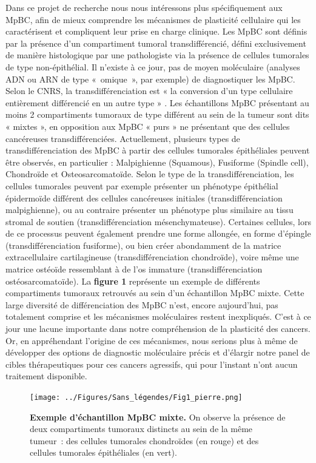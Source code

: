 \documentclass[11pt]{article}
\begin{document}
Dans ce projet de recherche nous nous intéressons plus spécifiquement aux MpBC, afin de mieux comprendre les mécanismes de plasticité cellulaire qui les caractérisent et compliquent leur prise en charge clinique. Les MpBC sont définis par la présence d’un compartiment tumoral transdifférencié, défini exclusivement de manière histologique par une pathologiste via la présence de cellules tumorales de type non-épithélial. Il n’existe à ce jour, pas de moyen moléculaire (analyses ADN ou ARN de type « omique », par exemple) de diagnostiquer les MpBC. Selon le CNRS, la transdifférenciation est « la conversion d’un type cellulaire entièrement différencié en un autre type » \cite{CNRS}. Les échantillons MpBC présentant au moins 2 compartiments tumoraux de type différent au sein de la tumeur sont dits « mixtes », en opposition aux MpBC « purs » ne présentant que des cellules cancéreuses transdifférenciées.
Actuellement, plusieurs types de transdifférenciation des MpBC à partir des cellules tumorales épithéliales peuvent être observés, en particulier : Malpighienne (Squamous), Fusiforme (Spindle cell), Chondroïde et Osteosarcomatoïde. Selon le type de la transdifférenciation, les cellules tumorales peuvent par exemple présenter un phénotype épithélial épidermoïde différent des cellules cancéreuses initiales (transdifférenciation malpighienne), ou au contraire présenter un phénotype plus similaire au tissu stromal de soutien (transdifférenciation mésenchymateuse). Certaines cellules, lors de ce processus peuvent également prendre une forme allongée, en forme d’épingle (transdifférenciation fusiforme), ou bien créer abondamment de la matrice extracellulaire cartilagineuse (transdifférenciation chondroïde), voire même une matrice ostéoïde ressemblant à de l’os immature (transdifférenciation ostéosarcomatoïde). La \textbf{figure 1} représente un exemple de différents compartiments tumoraux retrouvés au sein d’un échantillon MpBC mixte. Cette large diversité de différenciation des MpBC n’est, encore aujourd’hui, pas totalement comprise et les mécanismes moléculaires restent inexpliqués. C’est à ce jour une lacune importante dans notre compréhension de la plasticité des cancers. Or, en appréhendant l’origine de ces mécanismes, nous serions plus à même de développer des options de diagnostic moléculaire précis et d’élargir notre panel de cibles thérapeutiques pour ces cancers agressifs, qui pour l’instant n’ont aucun traitement disponible.



\begin{figure}[htbp]
    \centering
    \texttt{[image: ../Figures/Sans\_légendes/Fig1\_pierre.png]}
    \caption[\textbf{Figure 1 : Exemple d’échantillon MpBC mixte.}]{\footnotesize \textbf{Exemple d’échantillon MpBC mixte.} On observe la présence de deux compartiments tumoraux distincts au sein de la même tumeur : des cellules tumorales chondroïdes (en rouge) et des cellules tumorales épithéliales (en vert).}
    \label{fig:fig1}
\end{figure}
\end{document}
